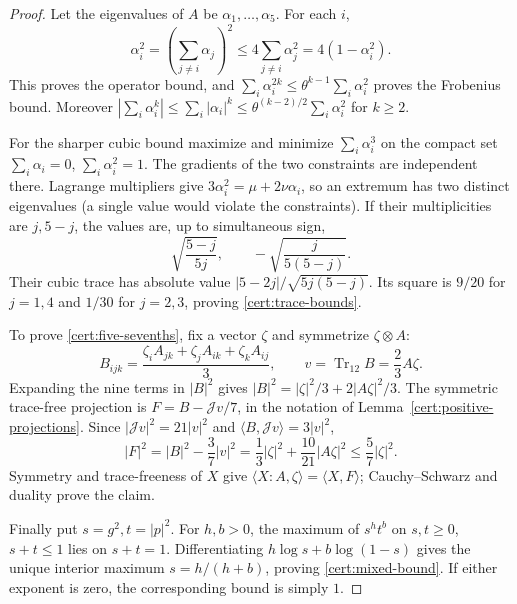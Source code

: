 \begin{proof}
Let the eigenvalues of $A$ be $\alpha_1,\ldots,\alpha_5$.  For each $i$,
\[
 \alpha_i^2=\left(\sum_{j\ne i}\alpha_j\right)^2
       \le4\sum_{j\ne i}\alpha_j^2=4(1-\alpha_i^2).
\]
This proves the operator bound, and
$\sum_i\alpha_i^{2k}\le\theta^{k-1}\sum_i\alpha_i^2$ proves the
Frobenius bound.  Moreover
$|\sum_i\alpha_i^k|\le\sum_i|\alpha_i|^k
\le\theta^{(k-2)/2}\sum_i\alpha_i^2$ for $k\ge2$.

For the sharper cubic bound maximize and minimize $\sum_i\alpha_i^3$ on
the compact set $\sum_i\alpha_i=0$, $\sum_i\alpha_i^2=1$.  The gradients
of the two constraints are independent there.  Lagrange multipliers give
$3\alpha_i^2=\mu+2\nu\alpha_i$, so an extremum has two distinct
eigenvalues (a single value would violate the constraints).  If their
multiplicities are $j,5-j$, the values are, up to simultaneous sign,
\[
 \sqrt{\frac{5-j}{5j}},\qquad
 -\sqrt{\frac{j}{5(5-j)}}.
\]
Their cubic trace has absolute value
$|5-2j|/\sqrt{5j(5-j)}$.  Its square is $9/20$ for $j=1,4$ and $1/30$
for $j=2,3$, proving \eqref{cert:trace-bounds}.

To prove \eqref{cert:five-sevenths}, fix a vector $\zeta$ and symmetrize
$\zeta\otimes A$:
\[
 B_{ijk}=\frac{\zeta_iA_{jk}+\zeta_jA_{ik}+\zeta_kA_{ij}}3,
 \qquad v=\operatorname{Tr}_{12}B=\frac23 A\zeta.
\]
Expanding the nine terms in $|B|^2$ gives
$|B|^2=|\zeta|^2/3+2|A\zeta|^2/3$.
The symmetric trace-free projection is $F=B-\mathcal Jv/7$, in the notation
of Lemma~\ref{cert:positive-projections}.  Since
$|\mathcal Jv|^2=21|v|^2$ and
$\langle B,\mathcal Jv\rangle=3|v|^2$,
\[
 |F|^2=|B|^2-\frac37|v|^2
       =\frac13|\zeta|^2+\frac{10}{21}|A\zeta|^2
       \le\frac57|\zeta|^2.
\]
Symmetry and trace-freeness of $X$ give
$\langle X:A,\zeta\rangle=\langle X,F\rangle$; Cauchy--Schwarz and
duality prove the claim.

Finally put $s=g^2,t=|p|^2$.  For $h,b>0$, the maximum of $s^ht^b$ on
$s,t\ge0$, $s+t\le1$ lies on $s+t=1$.  Differentiating
$h\log s+b\log(1-s)$ gives the unique interior maximum
$s=h/(h+b)$, proving \eqref{cert:mixed-bound}.  If either exponent is zero,
the corresponding bound is simply $1$.
\end{proof}

